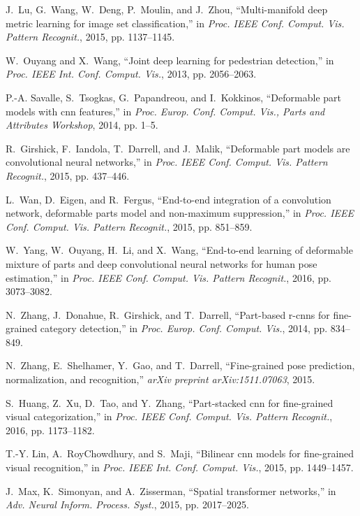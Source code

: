 \documentclass[10pt,journal,cspaper,compsoc]{IEEEtran}
\begin{document}
\begin{thebibliography}{10}
J.~Lu, G.~Wang, W.~Deng, P.~Moulin, and J.~Zhou, ``Multi-manifold deep metric
  learning for image set classification,'' in \emph{Proc. IEEE Conf. Comput.
  Vis. Pattern Recognit.}, 2015, pp. 1137--1145.

W.~Ouyang and X.~Wang, ``Joint deep learning for pedestrian detection,'' in
  \emph{Proc. IEEE Int. Conf. Comput. Vis.}, 2013, pp. 2056--2063.

P.-A. Savalle, S.~Tsogkas, G.~Papandreou, and I.~Kokkinos, ``Deformable part
  models with cnn features,'' in \emph{Proc. Europ. Conf. Comput. Vis., Parts
  and Attributes Workshop}, 2014, pp. 1--5.

R.~Girshick, F.~Iandola, T.~Darrell, and J.~Malik, ``Deformable part models are
  convolutional neural networks,'' in \emph{Proc. IEEE Conf. Comput. Vis.
  Pattern Recognit.}, 2015, pp. 437--446.

L.~Wan, D.~Eigen, and R.~Fergus, ``End-to-end integration of a convolution
  network, deformable parts model and non-maximum suppression,'' in \emph{Proc.
  IEEE Conf. Comput. Vis. Pattern Recognit.}, 2015, pp. 851--859.

W.~Yang, W.~Ouyang, H.~Li, and X.~Wang, ``End-to-end learning of deformable
  mixture of parts and deep convolutional neural networks for human pose
  estimation,'' in \emph{Proc. IEEE Conf. Comput. Vis. Pattern Recognit.},
  2016, pp. 3073--3082.

N.~Zhang, J.~Donahue, R.~Girshick, and T.~Darrell, ``Part-based r-cnns for
  fine-grained category detection,'' in \emph{Proc. Europ. Conf. Comput. Vis.},
  2014, pp. 834--849.

N.~Zhang, E.~Shelhamer, Y.~Gao, and T.~Darrell, ``Fine-grained pose prediction,
  normalization, and recognition,'' \emph{arXiv preprint arXiv:1511.07063},
  2015.

S.~Huang, Z.~Xu, D.~Tao, and Y.~Zhang, ``Part-stacked cnn for fine-grained
  visual categorization,'' in \emph{Proc. IEEE Conf. Comput. Vis. Pattern
  Recognit.}, 2016, pp. 1173--1182.

T.-Y. Lin, A.~RoyChowdhury, and S.~Maji, ``Bilinear cnn models for fine-grained
  visual recognition,'' in \emph{Proc. IEEE Int. Conf. Comput. Vis.}, 2015, pp.
  1449--1457.

J.~Max, K.~Simonyan, and A.~Zisserman, ``Spatial transformer networks,'' in
  \emph{Adv. Neural Inform. Process. Syst.}, 2015, pp. 2017--2025.


\end{thebibliography}
\end{document}
